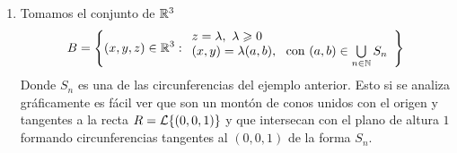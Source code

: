 \begin{ejemplo}
\begin{enumerate}
        \item Tomamos el conjunto de $\mathbb{R}^3$
        \begin{gather*}
            B = \left\{ (x,y,z)\in \mathbb{R}^3 : 
                \begin{array}{l}
                    z=\lambda,\ \lambda \geqslant 0\\
                    (x,y) = \lambda(a,b),\ \text{ con } (a,b)\in \bigcup\limits_{n\in \mathbb{N}}S_n
                \end{array}
            \right\}
        \end{gather*}
        Donde $S_n$ es una de las circunferencias del ejemplo anterior. Esto si se analiza gráficamente es fácil ver que son un montón de conos unidos con el origen y tangentes a la recta $R = \mathcal{L}\{(0,0,1)\}$ y que intersecan con el plano de altura $1$ formando circunferencias tangentes al $(0,0,1)$ de la forma $S_n$.

        \begin{figure}[H]
            \centering  
\end{figure}
\end{enumerate}
\end{ejemplo}
